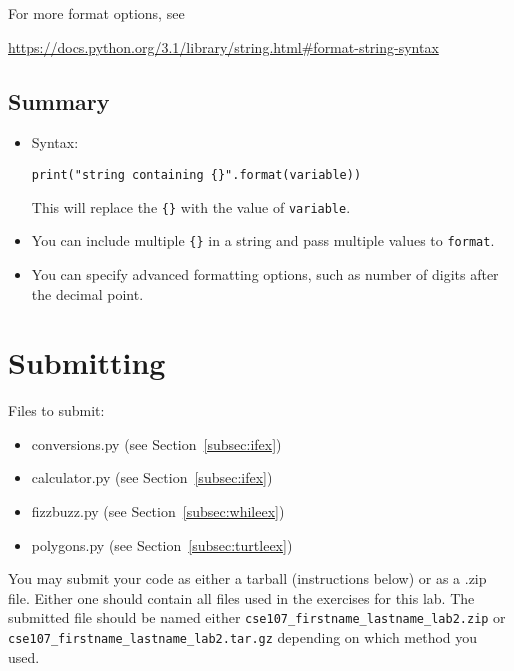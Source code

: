 \documentclass[11pt,hidelinks]{article}
\begin{document}
For more format options, see
\begin{center}
  \vspace{-2mm}
\url{https://docs.python.org/3.1/library/string.html#format-string-syntax}
\vspace{-2mm}

\end{center}

\subsection{Summary}

\begin{itemize}
  \item Syntax:
    \begin{lstlisting}
print("string containing {}".format(variable))
    \end{lstlisting}
    
    This will replace the \lstinline!{}! with the value of \lstinline{variable}.
    
  \item You can include multiple \lstinline!{}! in a string and pass multiple values to \lstinline{format}.

  \item You can specify advanced formatting options, such as number of digits after the decimal point.
\end{itemize}


\pagebreak

\section{Submitting}

Files to submit:
\begin{itemize}
  \item conversions.py (see Section~\ref{subsec:ifex})
  \item calculator.py (see Section~\ref{subsec:ifex})
  \item fizzbuzz.py (see Section~\ref{subsec:whileex})
  \item polygons.py (see Section~\ref{subsec:turtleex})
\end{itemize}

You may submit your code as either a tarball (instructions below) or as a .zip
file. Either one should contain all files used in the exercises for this lab.
The submitted file should be named either
\texttt{cse107\_firstname\_lastname\_lab2.zip} or
\texttt{cse107\_firstname\_lastname\_lab2.tar.gz} depending on which method you
used.
\end{document}
